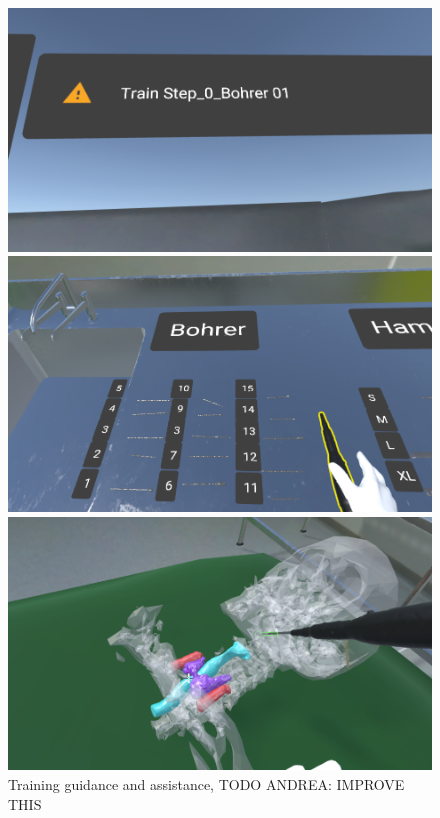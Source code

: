\begin{figure}
    \centering
    \begin{minipage}{.5\textwidth}
      \centering
      \includegraphics[width=0.95\linewidth]{images/implementation/features/training/train_guide.png}
    \end{minipage}%
    \begin{minipage}{.5\textwidth}
      \centering
      \includegraphics[width=0.915\linewidth]{images/implementation/features/training/train_select.png}
    \end{minipage}
    \begin{minipage}{1\textwidth}
        \centering
        \includegraphics[width=0.95\linewidth]{images/implementation/features/training/training.png}
      \end{minipage}%
    \caption{\label{fig::TrainingMode}Training guidance and assistance, TODO ANDREA: IMPROVE THIS}
  \end{figure}

